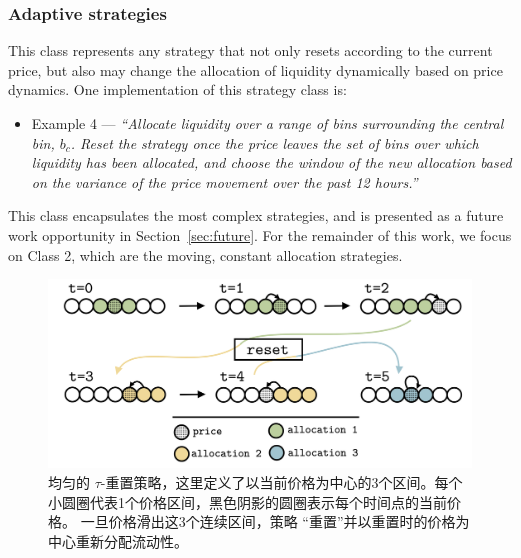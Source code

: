 \documentclass[sigconf, dvipsnames]{acmart}
\begin{document}
\subsubsection{Adaptive strategies}
This class represents any strategy that not only resets according to the current price, but also may change the allocation of liquidity dynamically based on price dynamics. One implementation of this strategy class is: 
\begin{itemize}
    \item[] Example 4 --- \textit{``Allocate liquidity over a range of bins surrounding the central bin, $b_c$. Reset the strategy once the price leaves the set of bins over which liquidity has been allocated, and choose the window of the new allocation based on the variance of the price movement over the past 12 hours.''}
\end{itemize}
This class encapsulates the most complex strategies, and is presented as a future work opportunity in Section~\ref{sec:future}. For the remainder of this work, we focus on Class 2, which are the moving, constant allocation strategies.

\fi

\begin{figure}
    \centering
    \includegraphics[width=\linewidth]{img/reset_strat.png}
    \caption{均匀的 $\tau$-重置策略，这里定义了以当前价格为中心的3个区间。每个小圆圈代表1个价格区间，黑色阴影的圆圈表示每个时间点的当前价格。
    一旦价格滑出这3个连续区间，策略 ``重置''并以重置时的价格为中心重新分配流动性。
    \label{fig:reset_strat}}
\end{figure}



\end{document}
